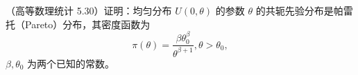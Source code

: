 \documentclass[answers]{exam}
\begin{document}
\begin{questions}
\begin{solution}
\begin{parts}
        \end{parts}
    \end{solution}

    \question
    （高等数理统计 5.30）证明：均匀分布 $U\left(0,\theta\right)$ 的参数 $\theta$ 的共轭先验分布是帕雷托（Pareto）分布，其密度函数为
    \begin{equation*}
        \pi(\theta)=\frac{\beta\theta_{0}^{\beta}}{\theta^{\beta+1}},\theta>\theta_{0},
    \end{equation*}
    $\beta,\theta_{0}$ 为两个已知的常数。
    \begin{solution}

    \end{solution}
\end{questions}
\end{document}
